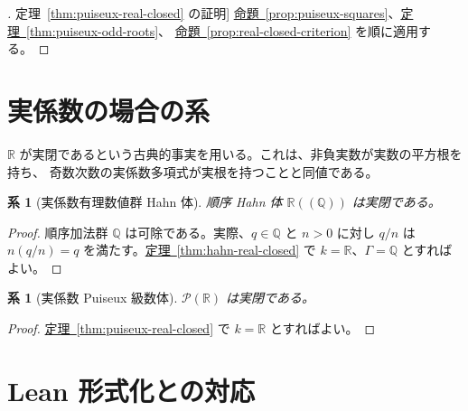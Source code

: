\documentclass[11pt,uplatex,dvipdfmx]{jsarticle}
\newcommand{\namedref}[2]{\hyperref[#2]{#1~\ref*{#2}}}
\theoremstyle{proofnote}
\newtheorem{corollary}[theorem]{系}
\begin{document}
\begin{proof}[\namedref{定理}{thm:puiseux-real-closed} の証明]
  \namedref{命題}{prop:puiseux-squares}、\namedref{定理}{thm:puiseux-odd-roots}、
  \namedref{命題}{prop:real-closed-criterion} を順に適用する。
\end{proof}

\section{実係数の場合の系}
\label{sec:real}

\(\mathbb R\) が実閉であるという古典的事実を用いる。これは、非負実数が実数の平方根を持ち、
奇数次数の実係数多項式が実根を持つことと同値である。

\begin{corollary}[実係数有理数値群 Hahn 体]
\label{cor:real-rational-hahn}
  順序 Hahn 体 \(\mathbb R((\mathbb Q))\) は実閉である。
\end{corollary}
\begin{proof}
  順序加法群 \(\mathbb Q\) は可除である。実際、\(q\in\mathbb Q\) と \(n>0\) に対し
  \(q/n\) は \(n(q/n)=q\) を満たす。\namedref{定理}{thm:hahn-real-closed} で
  \(k=\mathbb R\)、\(\Gamma=\mathbb Q\) とすればよい。
\end{proof}

\begin{corollary}[実係数 Puiseux 級数体]
\label{cor:real-puiseux}
  \(\mathcal P(\mathbb R)\) は実閉である。
\end{corollary}
\begin{proof}
  \namedref{定理}{thm:puiseux-real-closed} で \(k=\mathbb R\) とすればよい。
\end{proof}

\appendix

\section{Lean 形式化との対応}
\label{sec:lean}
\end{document}
